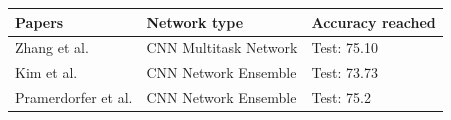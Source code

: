 \documentclass[10pt,twocolumn,letterpaper]{article}
\begin{document}
\begin{table}[h]
   \begin{center}
   \begin{tabular}{|M{2.2cm}|M{2.2cm}|M{1.6cm}|}
   \hline
   Papers & Network type & Accuracy reached\\
   \hline\hline
   Zhang et al. \cite{Zhang}& CNN Multitask Network& Test: 75.10\\\hline
   Kim et al. \cite{Kim}& CNN Network Ensemble & Test: 73.73\\\hline
   Pramerdorfer et al. \cite{147}& CNN Network Ensemble & Test: 75.2\\
   \hline
   \end{tabular}
   \end{center}
   \label{mytable}
\end{table}
\end{document}
